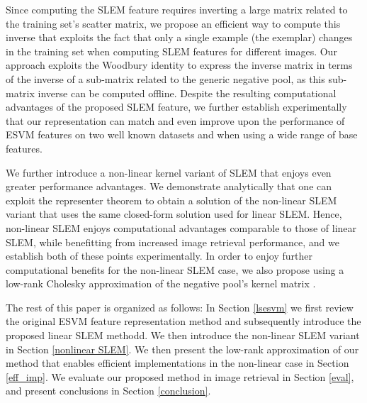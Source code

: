 Since computing the SLEM feature requires inverting a large matrix related to the training set's scatter matrix, we propose an efficient way to compute this inverse that exploits the fact that only a single example (the exemplar) changes in the training set when computing SLEM features for different images. Our approach exploits the Woodbury identity to express the inverse matrix in terms of the inverse of a sub-matrix related to the generic negative pool, as this sub-matrix inverse can be computed offline. Despite the resulting computational advantages of the proposed SLEM feature, we further establish experimentally that our representation can match and even improve upon the performance of ESVM features on two well known datasets and when using a wide range of base features. 

We further introduce a non-linear kernel variant of SLEM that enjoys even greater performance advantages. We demonstrate analytically that one can exploit the representer theorem to obtain a solution of the non-linear SLEM variant that uses the same closed-form solution used for linear SLEM. Hence, non-linear SLEM enjoys computational advantages comparable to those of linear SLEM, while benefitting from increased image retrieval performance, and we establish both of these points experimentally. In order to enjoy further computational benefits for the non-linear SLEM case, we also propose using a low-rank Cholesky approximation of the negative pool's  kernel matrix \cite{BaJo05}.

The rest of this paper is organized as follows: 
In Section \ref{lsesvm} we first review the original ESVM feature representation method and subsequently introduce the proposed linear SLEM methodd. We then introduce the non-linear SLEM variant in Section \ref{nonlinear SLEM}. We then present the low-rank approximation of our method that enables efficient implementations in the non-linear case in  Section \ref{eff_imp}. We evaluate our proposed method in image retrieval in Section \ref{eval}, and present conclusions in Section \ref{conclusion}.





